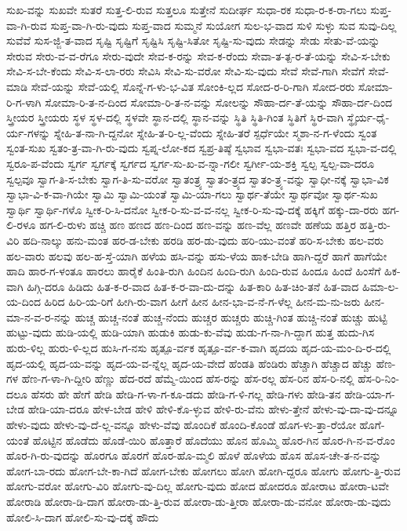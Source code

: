 {ಸುಖ-ವನ್ನು
ಸುಖವೇ
ಸುತರೆ
ಸುತ್ತ-ಲಿ-ರುವ
ಸುತ್ತಲೂ
ಸುತ್ತೇನೆ
ಸುದೀರ್ಘ
ಸುಧಾ-ರಕ
ಸುಧಾ-ರ-ಕ-ರಾ-ಗಲು
ಸುಪ್ತ-ವಾ-ಗಿ-ರುವ
ಸುಪ್ತ-ವಾ-ಗಿ-ರು-ವುದು
ಸುಪ್ತ-ವಾದ
ಸುಮ್ಮನೆ
ಸುಯೋಗ
ಸುಲ-ಭ-ವಾದ
ಸುಳಿ
ಸುಳ್ಳು
ಸುವ
ಸುವು-ದಿಲ್ಲ
ಸುವೆವೆ
ಸುಸ-ಜ್ಜಿ-ತ-ವಾದ
ಸೃಷ್ಟಿ
ಸೃಷ್ಟಿಗೆ
ಸೃಷ್ಟಿಸಿ
ಸೃಷ್ಟಿ-ಸಿತೋ
ಸೃಷ್ಟಿ-ಸು-ವುದು
ಸೇಡನ್ನು
ಸೇಡು
ಸೇತು-ವೆ-ಯನ್ನು
ಸೇರುವ
ಸೇರು-ವ-ವ-ರೆಗೂ
ಸೇರು-ವುದೇ
ಸೇವ-ಕ-ರನ್ನು
ಸೇವ-ಕ-ರೆಂದು
ಸೇವಾ-ತ-ತ್ಪ-ರ-ತೆ-ಯನ್ನು
ಸೇವಿ-ಸ-ಬೇಕು
ಸೇವಿ-ಸ-ಬೇ-ಕೆಂದು
ಸೇವಿ-ಸ-ಲಾ-ರರು
ಸೇವಿಸಿ
ಸೇವಿ-ಸು-ವರೋ
ಸೇವಿ-ಸು-ವುದು
ಸೇವೆ
ಸೇವೆ-ಗಾಗಿ
ಸೇವೆಗೆ
ಸೇವೆ-ಮಾಡಿ
ಸೇವೆ-ಯನ್ನು
ಸೇವೆ-ಯಲ್ಲಿ
ಸೊನ್ನೆ-ಗ-ಳು-ಭ-ವಿತ
ಸೋಂಕಿ-ಲ್ಲದ
ಸೋದ-ರ-ರಿ-ಗಾಗಿ
ಸೋದ-ರರು
ಸೋಮಾ-ರಿ-ಗ-ಳಾಗಿ
ಸೋಮಾ-ರಿ-ತ-ನ-ದಿಂದ
ಸೋಮಾ-ರಿ-ತ-ನ-ವನ್ನು
ಸೋಲನ್ನು
ಸೌಹಾ-ರ್ದ-ತೆ-ಯನ್ನು
ಸೌಹಾ-ರ್ದ-ದಿಂದ
ಸ್ತ್ರೀಯರ
ಸ್ತ್ರೀಯರು
ಸ್ಥಳ
ಸ್ಥಳ-ದಲ್ಲಿ
ಸ್ಥಳವೇ
ಸ್ಥಾನ-ದಲ್ಲಿ
ಸ್ಥಾನ-ವನ್ನು
ಸ್ಥಿತಿ
ಸ್ಥಿತಿ-ಗಿಂತ
ಸ್ಥಿತಿಗೆ
ಸ್ಥಿರ-ವಾಗಿ
ಸ್ಥೈರ್ಯ-ಧೈ-ರ್ಯ-ಗಳನ್ನು
ಸ್ನೇಹಿ-ತ-ನಾ-ಗಿ-ದ್ದನೋ
ಸ್ನೇಹಿ-ತ-ರಿ-ಲ್ಲ-ವೆಂದು
ಸ್ನೇಹಿ-ತರೆ
ಸ್ಪರ್ಧೆಯೇ
ಸ್ಮಶಾ-ನ-ಗ-ಳೆಂದು
ಸ್ವಂತ
ಸ್ವಂತ-ಸುಖ
ಸ್ವತಂ-ತ್ರ-ವಾ-ಗಿ-ರು-ವುದು
ಸ್ವಪ್ನ-ಲೋ-ಕದ
ಸ್ವಪ್ರ-ತಿಷ್ಠೆ
ಸ್ವಭಾವ
ಸ್ವಭಾ-ವತಃ
ಸ್ವಭಾ-ವದ
ಸ್ವಭಾ-ವ-ದಲ್ಲಿ
ಸ್ವರೂ-ಪ-ವೆಂದು
ಸ್ವರ್ಗ
ಸ್ವರ್ಗಕ್ಕೆ
ಸ್ವರ್ಗದ
ಸ್ವರ್ಗ-ಸು-ಖ-ವ-ನ್ನಾ-ಗಲೀ
ಸ್ವರ್ಗೀ-ಯ-ಶಕ್ತಿ
ಸ್ವಲ್ಪ
ಸ್ವಲ್ಪ-ವಾ-ದರೂ
ಸ್ವಲ್ಪವೂ
ಸ್ವಾಗ-ತಿ-ಸ-ಬೇಕು
ಸ್ವಾಗ-ತಿ-ಸು-ವರೋ
ಸ್ವಾತಂತ್ರ್ಯ
ಸ್ವಾತಂ-ತ್ರ್ಯದ
ಸ್ವಾತಂ-ತ್ರ್ಯ-ವನ್ನು
ಸ್ವಾಧೀ-ನಕ್ಕೆ
ಸ್ವಾಭಾ-ವಿಕ
ಸ್ವಾಭಾ-ವಿ-ಕ-ವಾ-ಗಿಯೇ
ಸ್ವಾಮಿ
ಸ್ವಾಮಿ-ಯಂತೆ
ಸ್ವಾಮಿ-ಯಾ-ಗಲು
ಸ್ವಾರ್ಥ-ತೆಯೇ
ಸ್ವಾರ್ಥವೋ
ಸ್ವಾರ್ಥ-ಸುಖ
ಸ್ವಾರ್ಥಿ
ಸ್ವಾರ್ಥಿ-ಗಳೊ
ಸ್ವೀಕ-ರಿ-ಸಿ-ದನೋ
ಸ್ವೀಕ-ರಿ-ಸು-ವ-ವ-ನಲ್ಲ
ಸ್ವೀಕ-ರಿ-ಸು-ವು-ದಕ್ಕೆ
ಹಕ್ಕಿಗೆ
ಹಕ್ಕು-ದಾ-ರರು
ಹಗ-ಲಿ-ರಳೂ
ಹಗ-ಲಿ-ರುಳು
ಹಚ್ಚಿ
ಹಣ
ಹಣದ
ಹಣ-ದಿಂದ
ಹಣ-ವನ್ನು
ಹಣ-ವೆಲ್ಲ
ಹಣವೇ
ಹಣೆಯ
ಹತ್ತಿರ
ಹತ್ತಿ-ರು-ವಿರಿ
ಹದಿ-ನಾಲ್ಕು
ಹನು-ಮಂತ
ಹರ-ಡ-ಬೇಕು
ಹರಡಿ
ಹರ-ಡು-ವುದು
ಹರಿ-ಯು-ವಂತೆ
ಹರಿ-ಸ-ಬೇಕು
ಹಲ-ವರು
ಹಲ-ವಾರು
ಹಲವು
ಹಲ-ಹ-ಸ್ತೆ-ಯಾಗಿ
ಹಳೆಯ
ಹಸಿ-ವನ್ನು
ಹಸು-ಳೆಯ
ಹಾಕ-ಬೇಡಿ
ಹಾಗಿ-ದ್ದರೆ
ಹಾಗೆ
ಹಾಗೆಯೇ
ಹಾದಿ
ಹಾರ-ಗ-ಳಂತೂ
ಹಾರಲು
ಹಾರೈಕೆ
ಹಿಂತಿ-ರುಗಿ
ಹಿಂದಿನ
ಹಿಂದಿ-ರುಗಿ
ಹಿಂದಿ-ರುವ
ಹಿಂದೂ
ಹಿಂದೆ
ಹಿಂಸೆಗೆ
ಹಿಕ-ವಾಗಿ
ಹಿಗ್ಗಿ-ದರೂ
ಹಿಡಿದು
ಹಿತ-ಕ-ರ-ವಾದ
ಹಿತ-ಕ-ರ-ವಾ-ದು-ದನ್ನು
ಹಿತ-ಕಾರಿ
ಹಿತ-ಚಿಂ-ತನೆ
ಹಿತ-ವಾದ
ಹಿಮಾ-ಲ-ಯ-ದಿಂದ
ಹಿರಿದ
ಹಿರಿ-ಯ-ರಿಗೆ
ಹೀಗಿ-ರು-ವಾಗ
ಹೀಗೆ
ಹೀನ
ಹೀನ-ಭಾ-ವ-ನೆ-ಗ-ಳೆಲ್ಲ
ಹೀನ-ಮ-ನು-ಜರು
ಹೀನ-ಮಾ-ನ-ವ-ರ-ನನ್ನು
ಹುಚ್ಚ
ಹುಚ್ಚ-ನಂತೆ
ಹುಚ್ಚ-ನೆಂದು
ಹುಚ್ಚರ
ಹುಚ್ಚರು
ಹುಚ್ಚಿ-ಗಿಂತ
ಹುಚ್ಚಿ-ನಂತೆ
ಹುಚ್ಚು
ಹುಟ್ಟಿ
ಹುಟ್ಟು-ವುದು
ಹುಡಿ-ಯಲ್ಲಿ
ಹುಡಿ-ಯಾಗಿ
ಹುಡುಕಿ
ಹುಡು-ಕು-ವೆವು
ಹುಡು-ಗ-ನಾ-ಗಿ-ದ್ದಾಗ
ಹುತ್ತ
ಹುದು-ಗಿಸ
ಹುರು-ಳಿಲ್ಲ
ಹುರು-ಳಿ-ಲ್ಲದ
ಹುಸಿ-ಗ-ನಸು
ಹೃತ್ಪೂ-ರ್ವಕ
ಹೃತ್ಪೂ-ರ್ವ-ಕ-ವಾಗಿ
ಹೃದಯ
ಹೃದ-ಯ-ಮಂ-ದಿ-ರ-ದಲ್ಲಿ
ಹೃದ-ಯಲ್ಲಿ
ಹೃದ-ಯ-ವನ್ನು
ಹೃದ-ಯ-ವ-ನ್ನೆಲ್ಲ
ಹೃದ-ಯ-ವೇದೆ
ಹೆಂಡತಿ
ಹೆಂಡಿರು
ಹೆಚ್ಚಾಗಿ
ಹೆಚ್ಚಾದ
ಹೆಚ್ಚು
ಹೆಣ-ಗಳ
ಹೆಣ-ಗ-ಳಾ-ಗಿ-ದ್ದೀರಿ
ಹೆಣ್ಣು
ಹೆದ-ರದೆ
ಹೆಮ್ಮೆ-ಯಿಂದ
ಹೆಸ-ರನ್ನು
ಹೆಸ-ರಲ್ಲ
ಹೆಸ-ರಿನ
ಹೆಸ-ರಿ-ನಲ್ಲಿ
ಹೆಸ-ರಿ-ನಿಂ-ದಲೂ
ಹೆಸರು
ಹೇ
ಹೇಗೆ
ಹೇಡಿ
ಹೇಡಿ-ಗ-ಳಾ-ಗ-ಕೂ-ಡದು
ಹೇಡಿ-ಗ-ಳಿ-ಗಲ್ಲ
ಹೇಡಿ-ಗಳು
ಹೇಡಿ-ತನ
ಹೇಡಿ-ಯಾ-ಗ-ಬೇಡ
ಹೇಡಿ-ಯಾ-ದರೂ
ಹೇಳ-ಬೇಡ
ಹೇಳಿ
ಹೇಳಿ-ಕೊ-ಳ್ಳುವ
ಹೇಳಿ-ರು-ವೆನು
ಹೇಳು-ತ್ತೇನೆ
ಹೇಳು-ವು-ದಾ-ವು-ದನ್ನೂ
ಹೇಳು-ವುದು
ಹೇಳು-ವು-ದೆ-ಲ್ಲ-ವನ್ನೂ
ಹೇಳು-ವೆವು
ಹೊಂದಿಕೆ
ಹೊಂದಿ-ಕೊಂಡೆ
ಹೊಗ-ಳು-ತ್ತಾ-ರೆಯೋ
ಹೊಗೆ-ಯಂತೆ
ಹೊಟ್ಟಿನ
ಹೊಡೆದು
ಹೊಡೆ-ಯಿರಿ
ಹೊತ್ತಾರೆ
ಹೊದೆಯು
ಹೊನ
ಹೊಮ್ಮಿ
ಹೊರ-ಗಿನ
ಹೊರ-ಗಿ-ನ-ವ-ರೊಂ
ಹೊರ-ಗಿ-ರು-ವುದನ್ನು
ಹೊರಗೂ
ಹೊರಗೆ
ಹೊರ-ಹೊ-ಮ್ಮಲಿ
ಹೊಳೆ
ಹೊಳೆಯ
ಹೊಸ
ಹೊಸ-ಚೇ-ತ-ನ-ವನ್ನು
ಹೋಗ-ಬಾ-ರದು
ಹೋಗ-ಬೇ-ಕಾ-ಗಿದೆ
ಹೋಗ-ಬೇಕು
ಹೋಗಲು
ಹೋಗಿ
ಹೋಗಿ-ದ್ದರೂ
ಹೋಗು
ಹೋಗು-ತ್ತಿ-ರುವ
ಹೋಗು-ವರೋ
ಹೋಗು-ವಿರಿ
ಹೋಗು-ವು-ದಿಲ್ಲ
ಹೋಗು-ವುದು
ಹೋದ
ಹೋದರೂ
ಹೋರಾಟ
ಹೋರಾ-ಟವೇ
ಹೋರಾಡಿ
ಹೋರಾ-ಡಿ-ದಾಗ
ಹೋರಾ-ಡು-ತ್ತಿ-ರುವ
ಹೋರಾ-ಡು-ತ್ತೀರಾ
ಹೋರಾ-ಡು-ವನೋ
ಹೋರಾ-ಡು-ವುದು
ಹೋಲಿ-ಸಿ-ದಾಗ
ಹೋಲಿ-ಸು-ವು-ದಕ್ಕೆ
ಹೌದು
}
